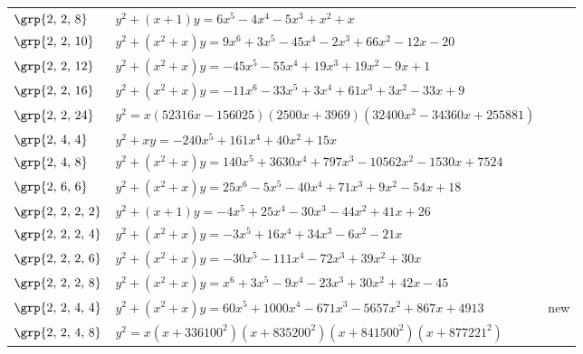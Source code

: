 \begin{longtable}{@{}>{\raggedright\arraybackslash}p{1.35cm}
 >{\raggedright\arraybackslash}p{}
 >{\raggedright\arraybackslash}p{1.25cm}@{}}
$\grp{2,\,2,\,8}$ & \href{https://www.lmfdb.org/Genus2Curve/Q/360/a/6480/1}{$y^2 + (x+1)y = 6x^{5}-4x^{4}-5x^{3}+x^{2}+x$} & \cite{BSSVY}\\
$\grp{2,\,2,\,10}$ & \href{https://alpha.lmfdb.org/Genus2Curve/Q/?jump=[[-20,-12,66,-2,-45,3,9],[0,1,1]]}{$y^2 + (x^{2}+x)y = 9x^{6}+3x^{5}-45x^{4}-2x^{3}+66x^{2}-12x-20$} & \cite{BookerSutherland}\\
$\grp{2,\,2,\,12}$ & \href{https://alpha.lmfdb.org/Genus2Curve/Q/?jump=[[1,-9,19,19,-55,-45],[0,1,1]]}{$y^2 + (x^{2}+x)y = -45x^{5}-55x^{4}+19x^{3}+19x^{2}-9x+1$} & \cite{BookerSutherland}\\
$\grp{2,\,2,\,16}$ & \href{https://alpha.lmfdb.org/Genus2Curve/Q/?jump=[[9,-33,3,61,3,-33,-11],[0,1,1]]}{$y^2 + (x^{2}+x)y = -11x^{6}-33x^{5}+3x^{4}+61x^{3}+3x^{2}-33x+9$} & \cite{BookerSutherland}\\
$\grp{2,\,2,\,24}$ & $y^2 = x(52316x-156025)(2500x+3969)(32400x^{2}-34360x+255881)$ & \cite{HLP2000}\\
$\grp{2,\,4,\,4}$ & \href{https://alpha.lmfdb.org/Genus2Curve/Q/?jump=[[0,15,40,0,161,-240],[0,1]]}{$y^2 + xy = -240x^{5}+161x^{4}+40x^{2}+15x$} & \cite{BookerSutherland}\\
$\grp{2,\,4,\,8}$ & \href{https://alpha.lmfdb.org/Genus2Curve/Q/?jump=[[7524,-1530,-10562,797,3630,140],[0,1,1]]}{$y^2 + (x^{2}+x)y = 140x^{5}+3630x^{4}+797x^{3}-10562x^{2}-1530x+7524$} & \cite{HLP2000}\\
$\grp{2,\,6,\,6}$ & \href{https://alpha.lmfdb.org/Genus2Curve/Q/?jump=[[18,-54,9,71,-40,-5,25],[0,1,1]]}{$y^2 + (x^{2}+x)y = 25x^{6}-5x^{5}-40x^{4}+71x^{3}+9x^{2}-54x+18$} & \cite{HLP2000}\\
$\grp{2,\,2,\,2,\,2}$ & \href{https://alpha.lmfdb.org/Genus2Curve/Q/?jump=[[26,41,-44,-30,25,-4],[1,1]]}{$y^2 + (x+1)y = -4x^{5}+25x^{4}-30x^{3}-44x^{2}+41x+26$} & \cite{BookerSutherland}\\
$\grp{2,\,2,\,2,\,4}$ & \href{https://alpha.lmfdb.org/Genus2Curve/Q/?jump=[[0,-21,-6,34,16,-3],[0,1,1]]}{$y^2 + (x^{2}+x)y = -3x^{5}+16x^{4}+34x^{3}-6x^{2}-21x$} & \cite{BookerSutherland}\\
$\grp{2,\,2,\,2,\,6}$ & \href{https://alpha.lmfdb.org/Genus2Curve/Q/?jump=[[0,30,39,-72,-111,-30],[0,1,1]]}{$y^2 + (x^{2}+x)y = -30x^{5}-111x^{4}-72x^{3}+39x^{2}+30x$} & \cite{BookerSutherland}\\
$\grp{2,\,2,\,2,\,8}$ & \href{https://alpha.lmfdb.org/Genus2Curve/Q/?jump=[[-45,42,30,-23,-9,3,1],[0,1,1]]}{$y^2 + (x^{2}+x)y = x^{6}+3x^{5}-9x^{4}-23x^{3}+30x^{2}+42x-45$} & \cite{BookerSutherland}\\
$\grp{2,\,2,\,4,\,4}$ & $y^2 + (x^{2}+x)y = 60x^{5}+1000x^{4}-671x^{3}-5657x^{2}+867x+4913$ & new\\
$\grp{2,\,2,\,4,\,8}$ & $y^2 = x(x+336100^2)(x+835200^2)(x+841500^2)(x+877221^2)$ & \cite{HLP2000}\\
\end{longtable}
\endgroup
